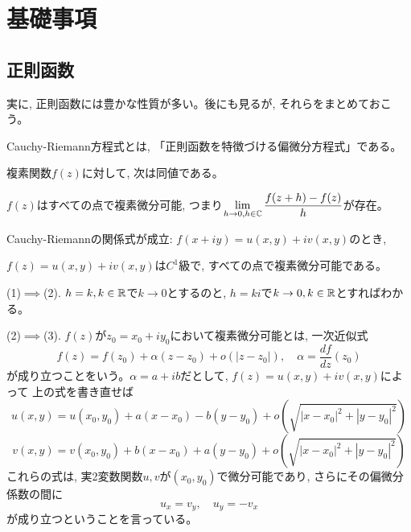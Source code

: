 \section{基礎事項}
\subsection{正則函数}

実に, 正則函数には豊かな性質が多い。後にも見るが, それらをまとめておこう。


Cauchy-Riemann方程式とは, 「正則函数を特徴づける偏微分方程式」である。
\begin{prop}
複素関数$f(z)$に対して, 次は同値である。
\ben
\item $f(z)$はすべての点で複素微分可能, つまり$\displaystyle\lim_{h\to 0, h\in \mathbb{C}} \dfrac{f(z+h) - f(z)}{h}$が存在。
\item Cauchy-Riemannの関係式が成立: $f(x+iy) = u(x,y) + iv(x,y)$のとき, 
\item $f(z)=u(x,y) + iv(x,y)$は$C^1$級で, すべての点で複素微分可能である。
\een
\end{prop}
\prf
(1)$\implies$(2). $h=k,k\in\mathbb{R}$で$k\to 0$とするのと, $h=ki$で$k\to 0, k\in \mathbb{R}$とすればわかる。

(2)$\implies$(3). $f(z)$が$z_0=x_0 + iy_0$において複素微分可能とは, 一次近似式
\[f(z) = f(z_0) + \alpha(z-z_0) + o(|z-z_0|),\quad \alpha = \dfrac{df}{dz}(z_0)\]
が成り立つことをいう。$\alpha = a + ib$だとして, $f(z) = u(x,y) + iv(x,y)$によって 上の式を書き直せば
\[u(x,y) = u(x_0,y_0) + a(x-x_0) - b(y-y_0) + o(\sqrt{|x-x_0|^2 + |y-y_0|^2})\]
\[v(x,y) = v(x_0,y_0) + b(x-x_0) + a(y-y_0) + o(\sqrt{|x-x_0|^2 + |y-y_0|^2})\]
これらの式は, 実2変数関数$u,v$が$(x_0,y_0)$で微分可能であり, さらにその偏微分係数の間に
\[u_x = v_y,\quad u_y = -v_x\]
が成り立つということを言っている。

